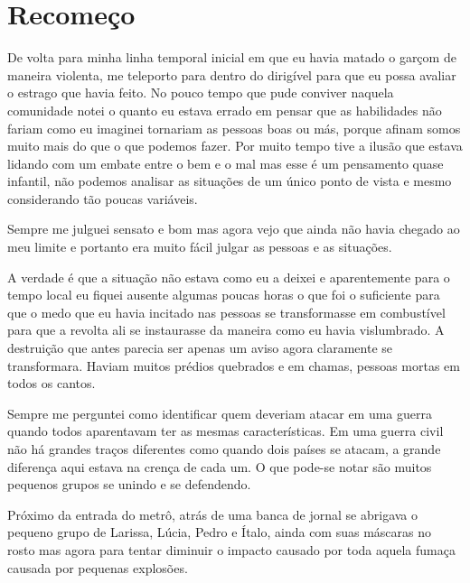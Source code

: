 
\chapter{Recomeço}


De volta para minha linha temporal  inicial em que eu havia matado o garçom de maneira violenta, me teleporto para dentro do dirigível para que eu possa avaliar o estrago que havia feito. No pouco tempo que pude conviver naquela comunidade notei o quanto eu estava errado em pensar que as habilidades não fariam como eu imaginei tornariam as pessoas boas ou más, porque afinam somos muito mais do que o que podemos fazer. Por muito tempo tive a ilusão que estava lidando com um embate entre o bem e o mal mas esse é um pensamento quase infantil, não podemos analisar as situações de um único ponto de vista e mesmo considerando tão poucas variáveis.
 
Sempre me julguei sensato e bom mas agora vejo que ainda não havia chegado ao meu limite e portanto era muito fácil julgar as pessoas e as situações. 

A verdade é que a situação não estava como eu a deixei e aparentemente para o tempo local eu fiquei ausente algumas poucas horas o que foi o suficiente para que o medo que eu havia incitado nas pessoas se transformasse em combustível para que a revolta ali se instaurasse da maneira como eu havia vislumbrado. A destruição que antes parecia ser apenas um aviso agora claramente se transformara.  Haviam muitos prédios quebrados e em chamas, pessoas mortas em todos os cantos.

Sempre me perguntei como identificar quem deveriam atacar em uma guerra quando todos aparentavam ter as mesmas características. Em uma guerra civil não há grandes traços diferentes como quando dois países se atacam, a grande diferença aqui estava na crença de cada um. O que pode-se notar são muitos pequenos grupos se unindo e se defendendo.

Próximo da entrada do metrô, atrás de uma banca de jornal se abrigava o pequeno grupo de Larissa, Lúcia, Pedro e Ítalo, ainda com suas máscaras no rosto mas agora para tentar diminuir o impacto causado por toda aquela fumaça causada por pequenas explosões.


